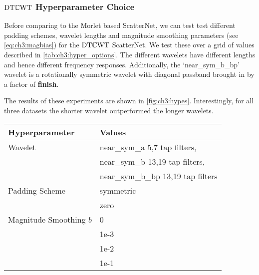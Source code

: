 \subsubsection{$\mathrm{DT}\mathbb{C}\mathrm{WT}$ Hyperparameter Choice}
Before comparing to the Morlet based ScatterNet, we can test 
test different padding schemes, wavelet lengths and magnitude smoothing parameters (see
\eqref{eq:ch3:magbias}) for the $\mathrm{DT}\mathbb{C}\mathrm{WT}$ ScatterNet. We test these over a grid of values described in
\autoref{tab:ch3:hyper_options}. The different wavelets have different lengths
and hence different frequency responses. Additionally, the `near\_sym\_b\_bp'
wavelet is a rotationally symmetric wavelet with diagonal passband brought in by
a factor of \textbf{finish}.

The results of these experiments are shown in \autoref{fig:ch3:hypes}.
Interestingly, for all three datasets the shorter wavelet outperformed the
longer wavelets. 

\begin{table}[bt]
  \centering
  \label{tab:ch3:hyper_options}
  \begin{tabular}{l l}
    \toprule
    Hyperparameter & Values \\
    \midrule
    Wavelet & near\_sym\_a 5,7 tap filters, \\ 
            & near\_sym\_b 13,19 tap filters,\\
            & near\_sym\_b\_bp 13,19 tap filters \\\midrule
    Padding Scheme & symmetric \\
                   & zero  \\\midrule
    Magnitude Smoothing $b$ & 0\\
                            & 1e-3 \\
                            & 1e-2 \\
                            & 1e-1 
    \\\bottomrule
  \end{tabular}
\end{table}

